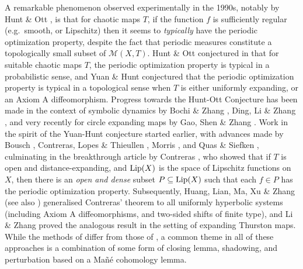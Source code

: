 \documentclass[reqno,11pt]{amsart}
\theoremstyle{definition}
\theoremstyle{remark}
\theoremstyle{remark}
\def\m{\mathcal M}
\def\lip{{\rm Lip}}
\numberwithin{equation}{section}
\begin{document}
A remarkable phenomenon observed experimentally in the 1990s, notably by Hunt \& Ott \cite{HO96a, HO96b},
is that for chaotic maps $T$, if the function $f$ is sufficiently regular (e.g.~smooth, or Lipschitz) then it seems to 
\emph{typically} have the periodic optimization property, despite the fact that periodic measures constitute a topologically small subset of $\m(X,T)$.
Hunt \& Ott conjectured in \cite{HO96a, HO96b} that for suitable chaotic maps $T$, the periodic optimization property is typical in a probabilistic sense, and Yuan \& Hunt \cite{YH99} conjectured that the periodic optimization property is typical
in a topological sense when $T$ is either uniformly expanding, or an Axiom A diffeomorphism.
Progress towards the Hunt-Ott Conjecture has been made in the context of symbolic dynamics by
Bochi \& Zhang \cite{bochizhang}, Ding, Li \& Zhang \cite{DLZ24}, and very recently for circle expanding maps by
Gao, Shen \& Zhang \cite{GSZ25}. Work in the spirit of the Yuan-Hunt conjecture started earlier,
with advances made by Bousch
\cite{B01, B08}, Contreras, Lopes \& Thieullen \cite{CLT01}, Morris \cite{morrisnonlinearity},
and Quas \& Siefken \cite{quassiefken}, culminating in the breakthrough article by Contreras \cite{C02},
who showed that if $T$ is open and distance-expanding, and $\lip(X)$ is the space of Lipschitz functions on $X$, then
there is an \emph{open and dense} subset $P\subseteq \lip(X)$ such that each $f\in P$ has the periodic optimization property.
Subsequently, Huang, Lian, Ma, Xu \& Zhang \cite{HLMXZ19} (see also \cite{Boc19}) generalised Contreras' theorem to all uniformly hyperbolic systems (including Axiom A diffeomorphisms, and two-sided shifts of finite type),
and Li \& Zhang \cite{LZ24} proved the analogous result in the setting of expanding Thurston maps.
While the methods of \cite{HLMXZ19, LZ24} differ from those of \cite{C02}, a common
theme in all of these approaches is a combination of some form of closing lemma, shadowing, and perturbation based on a Ma\~n\'e
cohomology lemma.
\end{document}
